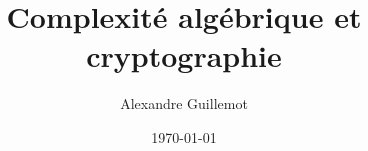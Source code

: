 \documentclass[11pt]{report}
\begin{document}
\title{Complexité algébrique et cryptographie}
\date{\today}
\author{Alexandre Guillemot}
\maketitle

\tableofcontents

\pagestyle{fancy}
\fancyhf{}
\lhead{\leftmark}
\cfoot{\thepage}



\nocite{*}
 

\end{document}
